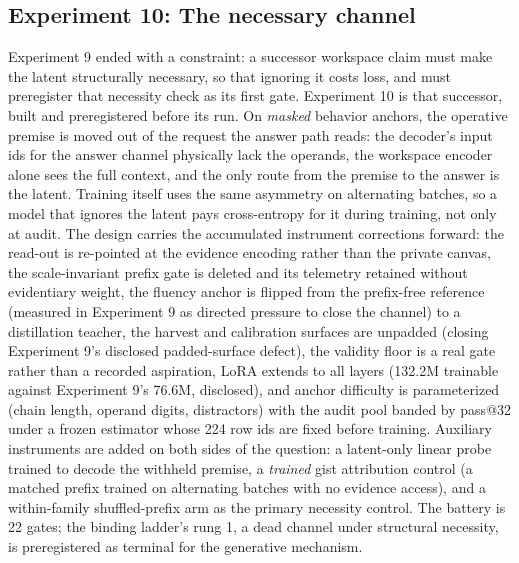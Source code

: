\documentclass[10pt,a4paper]{article}
\begin{document}
\subsection{Experiment 10: The necessary channel}
\label{sec:study10}

Experiment 9 ended with a constraint: a successor workspace claim must make the
latent structurally necessary, so that ignoring it costs loss, and must
preregister that necessity check as its first gate. Experiment 10 is that
successor, built and preregistered before its run. On \emph{masked} behavior
anchors, the operative premise is moved out of the request the answer path
reads: the decoder's input ids for the answer channel physically lack the
operands, the workspace encoder alone sees the full context, and the only
route from the premise to the answer is the latent. Training itself uses the
same asymmetry on alternating batches, so a model that ignores the latent
pays cross-entropy for it during training, not only at audit. The design
carries the accumulated instrument corrections forward: the read-out is
re-pointed at the evidence encoding rather than the private canvas, the
scale-invariant prefix gate is deleted and its telemetry retained without
evidentiary weight, the fluency anchor is flipped from the prefix-free
reference (measured in Experiment 9 as directed pressure to close the channel) to
a distillation teacher, the harvest and calibration surfaces are unpadded
(closing Experiment 9's disclosed padded-surface defect), the validity floor is a
real gate rather than a recorded aspiration, LoRA extends to all layers
(132.2M trainable against Experiment 9's 76.6M, disclosed), and anchor difficulty
is parameterized (chain length, operand digits, distractors) with the audit
pool banded by pass@32 under a frozen estimator whose 224 row ids are fixed
before training. Auxiliary instruments are added on both sides of the
question: a latent-only linear probe trained to decode the withheld premise,
a \emph{trained} gist attribution control (a matched prefix trained on
alternating batches with no evidence access), and a within-family
shuffled-prefix arm as the primary necessity control. The battery is 22
gates; the binding ladder's rung 1, a dead channel under structural
necessity, is preregistered as terminal for the generative mechanism.
\end{document}
